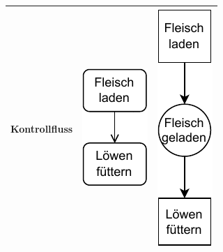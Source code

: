 \begin{longtable}{p{\sttpHilfA}|c|c}
			\parbox{\sttpHilfA}{\centering
				Kontrollfluss}
		&  
			\parbox{\sttpHilfB}{\centering
				\vspace{\sttpAbstandRand}
				\includegraphics[scale=\sttpFaktor]{Bilder/Kapitel-5/gegenueberstellung_3a.pdf}
				\vspace{\sttpAbstandRand}
			}
		& 
			\parbox{\sttpHilfB}{\centering
				\vspace{\sttpAbstandRand}
				\includegraphics[scale=\sttpFaktor]{Bilder/Kapitel-5/gegenueberstellung_3b.pdf}
				\vspace{\sttpAbstandRand}
			}
		\\
		
		\hline %
		

\end{longtable}
